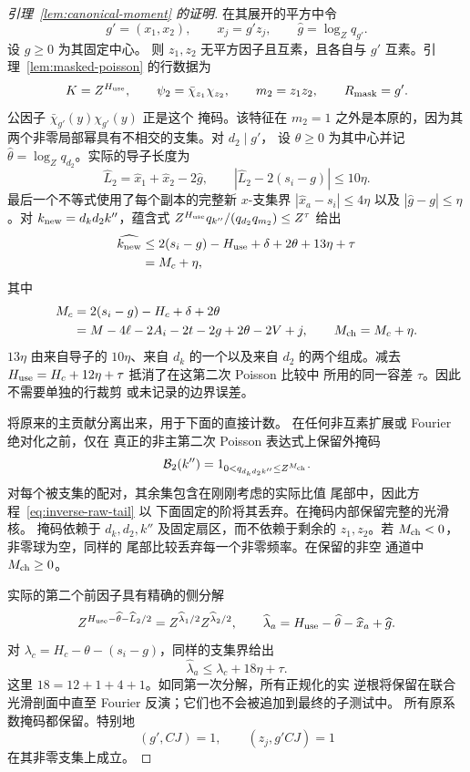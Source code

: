 \documentclass[11pt,a4paper]{article}
\numberwithin{equation}{section}
\numberwithin{figure}{section}
\theoremstyle{definition}
\theoremstyle{remark}
\begin{document}
\begin{proof}[引理~\ref{lem:canonical-moment} 的证明]
在其展开的平方中令
\[
 g'=(x_1,x_2),\qquad x_j=g'z_j,\qquad
 \widehat g=\log_Zq_{g'}.
\]
设 \(g\ge0\) 为其固定中心。
则 \(z_1,z_2\) 无平方因子且互素，且各自与
\(g'\) 互素。引理~\ref{lem:masked-poisson} 的行数据为
\begin{equation}\label{eq:second-masked-data}
 K=Z^{H_{\rm use}},\qquad
 \psi_2=\bar\chi_{z_1}\chi_{z_2},\qquad
 m_2=z_1z_2,\qquad R_{\rm mask}=g'.
\end{equation}
公因子 \(\bar\chi_{g'}(y)\chi_{g'}(y)\) 正是这个
掩码。该特征在 \(m_2=1\) 之外是本原的，因为其
两个非零局部幂具有不相交的支集。对 \(d_2\mid g'\)，
设 \(\theta\ge0\) 为其中心并记
\(\widehat\theta=\log_Zq_{d_2}\)。实际的导子长度为
\[
 \widehat L_2=\widehat x_1+\widehat x_2-2\widehat g,
 \qquad |\widehat L_2-2(s_i-g)|\le10\eta.
\]
最后一个不等式使用了每个副本的完整新 \(x\)-支集界
\(|\widehat x_a-s_i|\le4\eta\) 以及
\(|\widehat g-g|\le\eta\)。对 \(k_{\rm new}=d_kd_2k''\)，蕴含式
\(Z^{H_{\rm use}}q_{k''}/(q_{d_2}q_{m_2})\le Z^\tau\) 给出
\[
 \begin{split}
 \widehat{k_{\rm new}}
 &\le2(s_i-g)-H_{\rm use}+\delta+2\theta+13\eta+\tau\\
 &=M_c+\eta,
 \end{split}
\]
其中
\begin{equation}\label{eq:second-poisson-lengths}
 \begin{split}
 M_c&=2(s_i-g)-H_c+\delta+2\theta\\
    &=M-4\ell-2A_i-2t-2g+2\theta-2V+j,\qquad
 M_{\rm ch}=M_c+\eta.
 \end{split}
\end{equation}
\(13\eta\) 由来自导子的 \(10\eta\)、来自
\(d_k\) 的一个以及来自 \(d_2\) 的两个组成。减去
\(H_{\rm use}=H_c+12\eta+\tau\) 抵消了在这第二次 Poisson 比较中
所用的同一容差 \(\tau\)。因此不需要单独的行裁剪
或未记录的边界误差。

将原来的主贡献分离出来，用于下面的直接计数。
在任何非互素扩展或 Fourier 绝对化之前，仅在
真正的非主第二次 Poisson 表达式上保留外掩码
\[
 \mathcal B_2(k'')=1_{0<q_{d_kd_2k''}\le Z^{M_{\rm ch}}}.
\]
对每个被支集的配对，其余集包含在刚刚考虑的实际比值
尾部中，因此方程~\eqref{eq:inverse-raw-tail} 以
下面固定的阶将其丢弃。在掩码内部保留完整的光滑核。
掩码依赖于 \(d_k,d_2,k''\) 及固定扇区，而不依赖于剩余的
\(z_1,z_2\)。若 \(M_{\rm ch}<0\)，非零球为空，同样的
尾部比较丢弃每一个非零频率。在保留的非空
通道中 \(M_{\rm ch}\ge0\)。

实际的第二个前因子具有精确的侧分解
\[
 Z^{H_{\rm use}-\widehat\theta-\widehat L_2/2}
       =Z^{\widehat\lambda_1/2}Z^{\widehat\lambda_2/2},
 \qquad \widehat\lambda_a=H_{\rm use}-\widehat\theta-\widehat x_a+
                           \widehat g.
\]
对 \(\lambda_c=H_c-\theta-(s_i-g)\)，同样的支集界给出
\begin{equation}\label{eq:inverse-second-prefactor-error}
 \widehat\lambda_a\le\lambda_c+18\eta+\tau.
\end{equation}
这里 \(18=12+1+4+1\)。如同第一次分解，所有正规化的实
逆根将保留在联合光滑剖面中直至 Fourier
反演；它们也不会被追加到最终的子测试中。
所有原系数掩码都保留。特别地
\[
 (g',CJ)=1,\qquad (z_j,g'CJ)=1
\]
在其非零支集上成立。


\end{proof}
\end{document}
